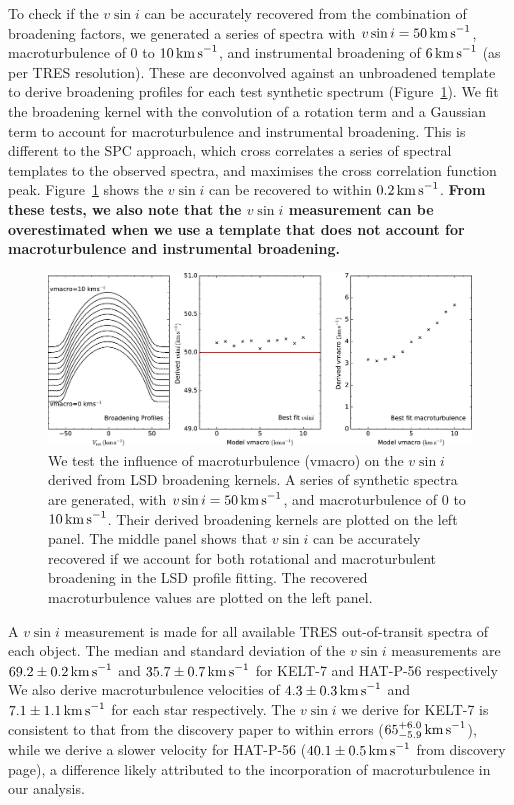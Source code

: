 \documentclass[useAMS,usenatbib]{mn2e}
\begin{document}
To check if the $v\sin i$ can be accurately recovered from the combination of broadening factors, we generated a series of spectra with $v\sin i=50\,\text{km\,s}^{-1}$, macroturbulence of 0 to $10\,\text{km\,s}^{-1}$, and instrumental broadening of $6\,\text{km\,s}^{-1}$ (as per TRES resolution). These are deconvolved against an unbroadened template to derive broadening profiles for each test synthetic spectrum (Figure~\ref{fig:vmacro}). We fit the broadening kernel with the convolution of a rotation term \citep[modelled analytically from][]{2005oasp.book.....G} and a Gaussian term to account for macroturbulence \citep[expected for F-stars at $6500\,\text{K}$ to be $\sim 6\,\text{km\,s}^{-1}$][]{2014MNRAS.444.3592D} and instrumental broadening. This is different to the SPC approach, which cross correlates a series of spectral templates to the observed spectra, and maximises the cross correlation function peak. Figure~\ref{fig:vmacro} shows the $v\sin i$ can be recovered to within $0.2\,\text{km\,s}^{-1}$. \textbf{From these tests, we also note that the $v\sin i$ measurement can be overestimated when we use a template that does not account for macroturbulence and instrumental broadening. }

\begin{figure}
  \includegraphics[width=12cm]{plots/vmacro.eps}
  \caption{\label{fig:vmacro} We test the influence of macroturbulence (vmacro) on the $v\sin i$ derived from LSD broadening kernels. A series of synthetic spectra are generated, with $v\sin i=50\,\text{km\,s}^{-1}$, and macroturbulence of 0 to $10\,\text{km\,s}^{-1}$. Their derived broadening kernels are plotted on the left panel. The middle panel shows that $v\sin i$ can be accurately recovered if we account for both rotational and macroturbulent broadening in the LSD profile fitting. The recovered macroturbulence values are plotted on the left panel.}
\end{figure}

A $v\sin i$ measurement is made for all available TRES out-of-transit spectra of each object. The median and standard deviation of the $v\sin i$ measurements are $69.2\pm0.2\,\text{km\,s}^{-1}$ and $35.7\pm0.7\,\text{km\,s}^{-1}$ for KELT-7 and HAT-P-56 respectively  We also derive macroturbulence velocities of $4.3\pm0.3\,\text{km\,s}^{-1}$ and $7.1\pm1.1\,\text{km\,s}^{-1}$ for each star respectively. The $v\sin i$ we derive for KELT-7 is consistent to that from the discovery paper to within errors ($65_{-5.9}^{+6.0}\,\text{km\,s}^{-1}$), while we derive a slower velocity for HAT-P-56 ($40.1\pm0.5\,\text{km\,s}^{-1}$ from discovery page), a difference likely attributed to the incorporation of macroturbulence in our analysis.   
\end{document}
